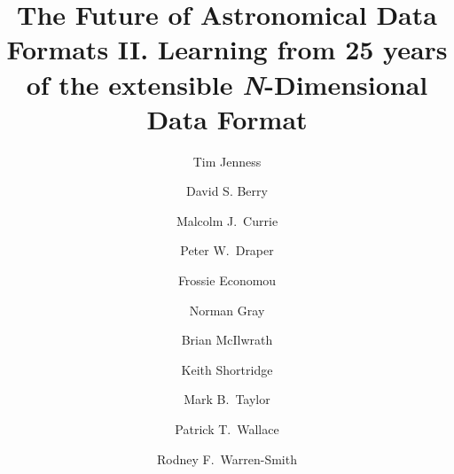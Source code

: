 \documentclass[final,authoryear,5p,times,twocolumn]{elsarticle}
\begin{document}
\begin{frontmatter}



\title{The Future of Astronomical Data Formats II. Learning from 25
  years of the extensible \emph{N}-Dimensional Data Format}


\author[cornell]{Tim Jenness}
\author[jac]{David S. Berry}
\author[jac]{Malcolm J.\ Currie}
\author[durham]{Peter W.\ Draper}
\author[noao]{Frossie Economou}
\author[glasgow]{Norman Gray}
\author[ral]{Brian McIlwrath}
\author[aao]{Keith Shortridge}
\author[bristol]{Mark B.\ Taylor}
\author[ral]{Patrick T.\ Wallace}
\author[ral]{Rodney F.\ Warren-Smith}


\address[cornell]{Department of Astronomy, Cornell University, Ithaca,
  NY 14853, USA}
\address[jac]{Joint Astronomy Centre, 660 N.\ A`oh\=ok\=u Place, Hilo, HI
  96720, USA}
\address[durham]{Department of Physics, Institute for Computational Cosmology, University of Durham, South Road, Durham DH1 3LE, UK}
\address[noao]{National Optical Astronomy
  Observatory, 950 N Cherry Ave, Tucson, AZ 85719, USA}
\address[glasgow]{SUPA School of Physics \& Astronomy, University of Glasgow, Glasgow G12 8QQ, UK}
\address[ral]{RAL Space, STFC Rutherford Appleton Laboratory, Harwell Oxford, Didcot, Oxfordshire OX11 0QX, UK}
\address[aao]{Australian Astronomical Observatory, 105 Delhi Rd, North
Ryde, NSW 2113, Australia}
\address[bristol]{H.\ H.\ Wills Physics Laboratory, Bristol University, Tyndall Avenue, Bristol, UK}


\end{frontmatter}
\end{document}
